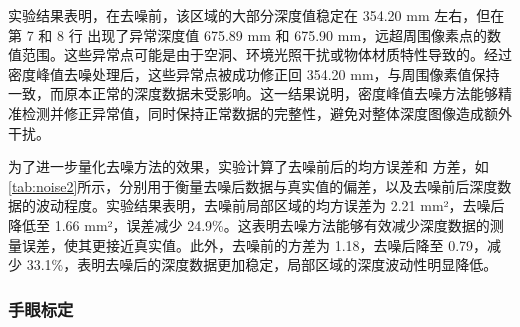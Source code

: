 实验结果表明，在去噪前，该区域的大部分深度值稳定在 354.20 mm 左右，但在第 7 和 8 行 出现了异常深度值 675.89 mm 和 675.90 mm，远超周围像素点的数值范围。这些异常点可能是由于空洞、环境光照干扰或物体材质特性导致的。经过密度峰值去噪处理后，这些异常点被成功修正回 354.20 mm，与周围像素值保持一致，而原本正常的深度数据未受影响。这一结果说明，密度峰值去噪方法能够精准检测并修正异常值，同时保持正常数据的完整性，避免对整体深度图像造成额外干扰。
\begin{table}[htbp]
	\caption[局部区域去噪前后均方误差和方差]{局部区域去噪前后均方误差和方差}
	\label{tab:noise2}
\end{table}

为了进一步量化去噪方法的效果，实验计算了去噪前后的均方误差和 方差，如\cref{tab:noise2}所示，分别用于衡量去噪后数据与真实值的偏差，以及去噪前后深度数据的波动程度。实验结果表明，去噪前局部区域的均方误差为 2.21 mm²，去噪后降低至 1.66 mm²，误差减少 24.9\%。这表明去噪方法能够有效减少深度数据的测量误差，使其更接近真实值。此外，去噪前的方差为 1.18，去噪后降至 0.79，减少 33.1\%，表明去噪后的深度数据更加稳定，局部区域的深度波动性明显降低。

\subsubsection{手眼标定}

